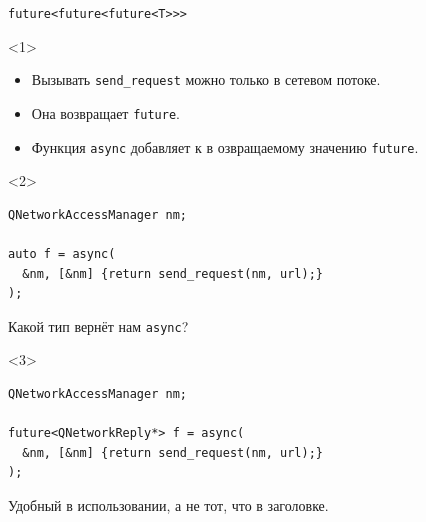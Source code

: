 \documentclass[aspectratio=169,hyperref={unicode},17pt]{beamer}
\begin{document}
\begin{frame}[fragile,t]{\texttt{future<future<future<T>{}>{}>}}
\begin{onlyenv}<1>
\begin{itemize}
 \item Вызывать \texttt{send\_request} можно только в сетевом потоке.
 \item Она возвращает \texttt{future}.
 \item Функция \texttt{async} добавляет к в озвращаемому значению \texttt{future}.
\end{itemize}
\end{onlyenv}
\begin{onlyenv}<2>
\begin{lstlisting}[style=cppcode]
QNetworkAccessManager nm;

auto f = async(
  &nm, [&nm] {return send_request(nm, url);}
);
\end{lstlisting}
Какой тип вернёт нам \texttt{async}?
\end{onlyenv}
\begin{onlyenv}<3>
\begin{lstlisting}[style=cppcode]
QNetworkAccessManager nm;

future<QNetworkReply*> f = async(
  &nm, [&nm] {return send_request(nm, url);}
);
\end{lstlisting}
Удобный в использовании, а не тот, что в заголовке.
\end{onlyenv}
\end{frame}
\end{document}
